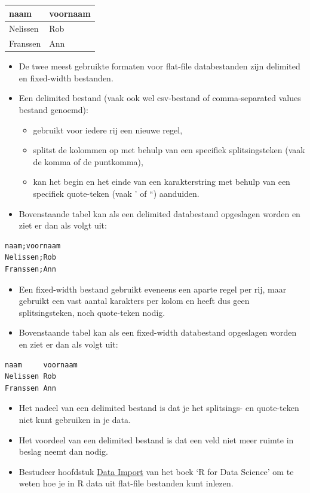 \documentclass[]{tufte-book}
\providecommand{\tightlist}{%
  \setlength{\itemsep}{0pt}\setlength{\parskip}{0pt}}
\begin{document}
\begin{longtable}[]{@{}ll@{}}
\toprule
naam & voornaam \\
\midrule
\endhead
Nelissen & Rob \\
Franssen & Ann \\
\bottomrule
\end{longtable}

\begin{itemize}
\tightlist
\item
  De twee meest gebruikte formaten voor flat-file databestanden zijn delimited en fixed-width bestanden.
\item
  Een delimited bestand (vaak ook wel csv-bestand of comma-separated values bestand genoemd):

  \begin{itemize}
  \tightlist
  \item
    gebruikt voor iedere rij een nieuwe regel,
  \item
    splitst de kolommen op met behulp van een specifiek splitsingsteken (vaak de komma of de puntkomma),
  \item
    kan het begin en het einde van een karakterstring met behulp van een specifiek quote-teken (vaak ' of ``) aanduiden.
  \end{itemize}
\item
  Bovenstaande tabel kan als een delimited databestand opgeslagen worden en ziet er dan als volgt uit:
\end{itemize}

\begin{verbatim}
naam;voornaam
Nelissen;Rob
Franssen;Ann
\end{verbatim}

\begin{itemize}
\tightlist
\item
  Een fixed-width bestand gebruikt eveneens een aparte regel per rij, maar gebruikt een vast aantal karakters per kolom en heeft dus geen splitsingsteken, noch quote-teken nodig.
\item
  Bovenstaande tabel kan als een fixed-width databestand opgeslagen worden en ziet er dan als volgt uit:
\end{itemize}

\begin{verbatim}
naam     voornaam
Nelissen Rob
Franssen Ann
\end{verbatim}

\begin{itemize}
\tightlist
\item
  Het nadeel van een delimited bestand is dat je het splitsings- en quote-teken niet kunt gebruiken in je data.
\item
  Het voordeel van een delimited bestand is dat een veld niet meer ruimte in beslag neemt dan nodig.
\item
  Bestudeer hoofdstuk \href{http://r4ds.had.co.nz/data-import.html}{Data Import} van het boek `R for Data Science' om te weten hoe je in R data uit flat-file bestanden kunt inlezen.
\end{itemize}
\end{document}
